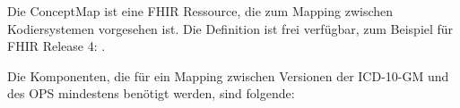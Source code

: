 \label{conceptmap-structure}

Die ConceptMap ist eine FHIR Ressource, die zum Mapping zwischen Kodiersystemen vorgesehen ist. Die Definition ist frei verfügbar, zum Beispiel für FHIR Release 4: \cite[FHIR R4]{conceptmap-r4}.

Die Komponenten, die für ein Mapping zwischen Versionen der ICD-10-GM und des OPS mindestens benötigt werden, sind folgende:

\begin{comment}
\begin{customIndentRight2}
\setlength{\tabcolsep}{12pt}
\begin{tabular}{ccccc}
ConceptMap & & & & \\
\drawHookArrow & url & & & \\
\drawHookArrow & id & & & \\
\drawHookArrow & group & & & \\
               & \drawHookArrow & source & & \\
               & \drawHookArrow & target & & \\
               & \drawHookArrow & element & & \\
               &                & \drawHookArrow & code & \\
               &                & \drawHookArrow & target & \\
               &                &                & \drawHookArrow & code \\
               &                &                & \drawHookArrow & equivalence \\
\end{tabular}
\end{customIndentRight2}
\end{comment}

